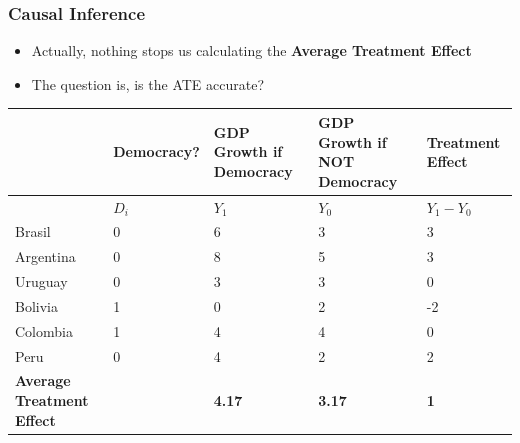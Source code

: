 \documentclass[xcolor=x11names,compress]{beamer}\usepackage[]{graphicx}\usepackage[]{xcolor}
\renewcommand{\(}{\begin{columns}}
\renewcommand{\)}{\end{columns}}
\newcommand{\<}[1]{\begin{column}{#1}}
\renewcommand{\>}{\end{column}}
\begin{document}
\begin{frame}
\frametitle{Causal Inference}
\begin{itemize}
\item Actually, nothing stops us calculating the \textbf{Average Treatment Effect}
\pause
\item The question is, is the ATE accurate?
\pause
\end{itemize}
\scriptsize
\begin{table}[htbp]
  \centering
    \begin{tabular}{|p{1.8cm}|p{1.8cm}|p{2cm}|p{2cm}|p{2cm}|}
    \hline
          & \multicolumn{1}{p{1.8cm}|}{Democracy?} & \multicolumn{1}{p{2cm}|}{GDP Growth if Democracy} & \multicolumn{1}{p{2.2cm}|}{GDP Growth if NOT Democracy} & \textbf{Treatment Effect} \bigstrut\\
    \hline
          & \multicolumn{1}{p{1.8cm}|}{$D_i$} & \multicolumn{1}{p{2cm}|}{$Y_1$} & \multicolumn{1}{p{2.2cm}|}{$Y_0$} & \multicolumn{1}{p{1.8cm}|}{$Y_{1} - Y_{0}$} \bigstrut\\
    \hline
    Brasil & 0 & 6     & 3     & 3 \bigstrut\\
    \hline
    Argentina & 0 & 8    & 5     & 3 \bigstrut\\
    \hline
    Uruguay & 0 & 3 & 3 & 0  \bigstrut\\
    \hline
    Bolivia & 1 & 0     & 2     & -2 \bigstrut\\
    \hline
    Colombia & 1 & 4    & 4    & 0 \bigstrut\\
    \hline
    Peru & 0 & 4     & 2     & 2 \bigstrut\\
    \hline
    \textbf{Average Treatment Effect} & & \textbf{4.17} & \textbf{3.17} & \textbf{1} \bigstrut\\
    \hline
    \end{tabular}%
  \label{tab:addlabel}%
\end{table}%
\normalsize
\end{frame}
\end{document}
